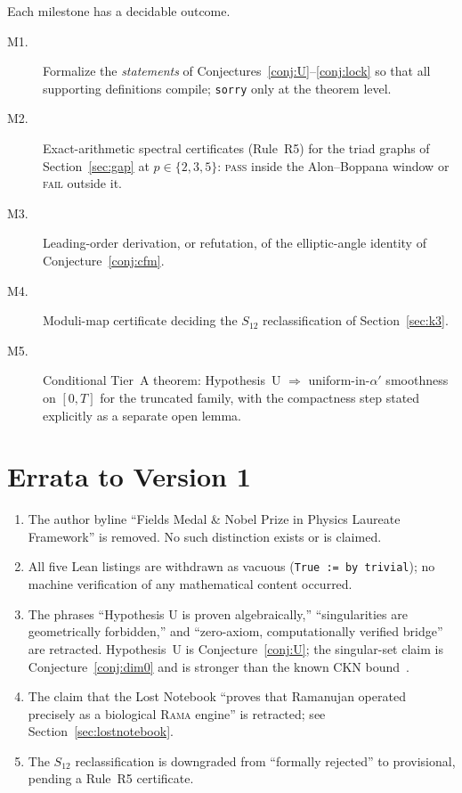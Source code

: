 \documentclass[11pt,a4paper]{article}
\theoremstyle{plain}
\theoremstyle{definition}
\theoremstyle{remark}
\begin{document}
Each milestone has a decidable outcome.

\begin{description}
\item[M1.] Formalize the \emph{statements} of
Conjectures~\ref{conj:U}--\ref{conj:lock} so that all supporting definitions
compile; \texttt{sorry} only at the theorem level.
\item[M2.] Exact-arithmetic spectral certificates (Rule~R5) for the triad
graphs of Section~\ref{sec:gap} at $p\in\{2,3,5\}$: \textsc{pass} inside the
Alon--Boppana window or \textsc{fail} outside it.
\item[M3.] Leading-order derivation, or refutation, of the elliptic-angle
identity of Conjecture~\ref{conj:cfm}.
\item[M4.] Moduli-map certificate deciding the $S_{12}$ reclassification of
Section~\ref{sec:k3}.
\item[M5.] Conditional Tier~A theorem: Hypothesis~U $\Rightarrow$
uniform-in-$\alpha'$ smoothness on $[0,T]$ for the truncated family, with
the compactness step stated explicitly as a separate open lemma.
\end{description}

\section{Errata to Version 1}\label{sec:errata}

\begin{enumerate}
\item The author byline ``Fields Medal \& Nobel Prize in Physics Laureate
Framework'' is removed. No such distinction exists or is claimed.
\item All five Lean listings are withdrawn as vacuous
(\texttt{True := by trivial}); no machine verification of any mathematical
content occurred.
\item The phrases ``Hypothesis U is proven algebraically,'' ``singularities
are geometrically forbidden,'' and ``zero-axiom, computationally verified
bridge'' are retracted. Hypothesis~U is Conjecture~\ref{conj:U}; the
singular-set claim is Conjecture~\ref{conj:dim0} and is stronger than the
known CKN bound~\cite{CKN1982}.
\item The claim that the Lost Notebook ``proves that Ramanujan operated
precisely as a biological \textsc{Rama} engine'' is retracted; see
Section~\ref{sec:lostnotebook}.
\item The $S_{12}$ reclassification is downgraded from ``formally rejected''
to provisional, pending a Rule~R5 certificate.
\end{enumerate}
\end{document}
